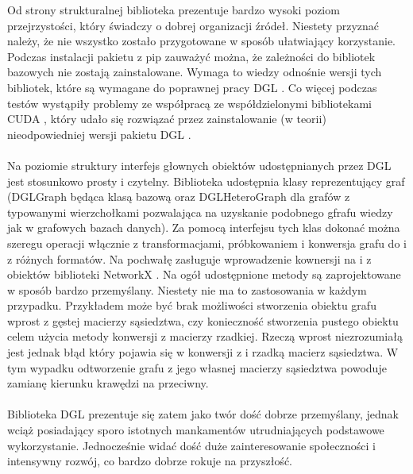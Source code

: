 \documentclass{article}
\begin{document}
 Od strony strukturalnej biblioteka prezentuje bardzo wysoki poziom przejrzystości, który świadczy o dobrej organizacji źródeł. Niestety przyznać należy, że nie wszystko zostało przygotowane w sposób ułatwiający korzystanie. Podczas instalacji pakietu z pip zauważyć można, że zależności do bibliotek bazowych nie zostają zainstalowane. Wymaga to wiedzy odnośnie wersji tych bibliotek, które są wymagane do poprawnej pracy DGL \cite{dgl}. Co więcej podczas testów wystąpiły problemy ze współpracą ze współdzielonymi bibliotekami CUDA \cite{cuda}, który udało się rozwiązać przez zainstalowanie (w teorii) nieodpowiedniej wersji pakietu DGL \cite{dgl}.

 \paragraph{}
 Na poziomie struktury interfejs głownych obiektów udostępnianych przez DGL \cite{dgl} jest stosunkowo prosty i czytelny. Biblioteka udostępnia klasy reprezentujący graf (DGLGraph będąca klasą bazową oraz DGLHeteroGraph dla grafów z typowanymi wierzchołkami pozwalająca na uzyskanie podobnego gfrafu wiedzy jak w grafowych bazach danych). Za pomocą interfejsu tych klas dokonać można szeregu operacji włącznie z transformacjami, próbkowaniem i konwersja grafu do i z różnych formatów. Na pochwałę zasługuje wprowadzenie kownersji na i z obiektów biblioteki NetworkX \cite{nx}.  Na ogół udostępnione metody są zaprojektowane w sposób bardzo przemyślany. Niestety nie ma to zastosowania w każdym przypadku. Przykładem może być brak możliwości stworzenia obiektu grafu wprost z gęstej macierzy sąsiedztwa, czy konieczność stworzenia pustego obiektu celem użycia metody konwersji z macierzy rzadkiej. Rzeczą wprost niezrozumiałą jest jednak błąd który pojawia się w konwersji z i rzadką macierz sąsiedztwa. W tym wypadku odtworzenie grafu z jego własnej macierzy sąsiedztwa powoduje zamianę kierunku krawędzi na przeciwny.

\paragraph{}
Biblioteka DGL \cite{dgl} prezentuje się zatem jako twór dość dobrze przemyślany, jednak wciąż posiadający sporo istotnych mankamentów utrudniających podstawowe wykorzystanie. Jednocześnie widać dość duże zainteresowanie społeczności i intensywny rozwój, co bardzo dobrze rokuje na przyszłość.
\end{document}
